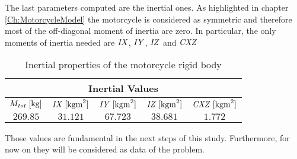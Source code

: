The last parameters computed are the inertial ones. As highlighted in chapter \ref{Ch:MotorcycleModel} the motorcycle is considered as symmetric and therefore most of the off-diagonal moment of inertia are zero. In particular, the only moments of inertia needed are ${\it IX}$, ${\it IY}$, ${\it IZ}$ and ${\it CXZ}$

%
\begin{table}[h!]
    \centering
    \begin{tabular}{@{}ccccc@{}}
    \toprule
    \multicolumn{5}{c}{\textbf{Inertial Values}} \\ \midrule
    $M_{{\it tot}} \; [\si{\kilogram}]$ & ${\it IX} \; [\si{\kilogram\metre^2}]$ & ${\it IY} \; [\si{\kilogram\metre^2}]$ & ${\it IZ} \; [\si{\kilogram\metre^2}]$ & ${\it CXZ} \; [\si{\kilogram\metre^2}]$\\
    $269.85$ & $31.121$ & $67.723$ & $38.681$ & $1.772$\\ \bottomrule
    \end{tabular}
    \caption{Inertial properties of the motorcycle rigid body}
    \label{tab:Inertia}
\end{table}
%

Those values are fundamental in the next steps of this study. Furthermore, for now on they will be considered as data of the problem. 
%